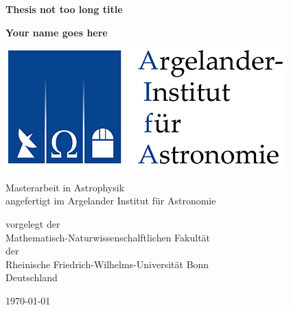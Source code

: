 \documentclass[a4paper, 10pt, twoside]{book}
\def\title{Thesis not too long title}
\def\thesisauthor{Your name goes here}
\begin{document}
    \frontmatter  %

    \begin{titlepage}
        \begin{center}
            \vspace{0.5cm}

            \Huge
            \textbf{\title}

            \vspace{0.5cm}
            \LARGE

            \vspace{1.5cm}

            \textbf{\thesisauthor}

            \vspace{4cm}

            \begin{center}
                \includegraphics{logo_aifa}
            \end{center}

            \vfill

            Masterarbeit in Astrophysik\\
            angefertigt im Argelander Institut f\"ur Astronomie

            \vspace{0.5cm}

            \Large
            vorgelegt der \\
            Mathematisch-Naturwissenschalftlichen Fakult\"at \\
            der \\
            Rheinische Friedrich-Wilhelms-Universit\"at Bonn\\
            Deutschland

            \vspace{0.5cm}

            \LARGE
            \today

        \end{center}
    \end{titlepage}
\end{document}
